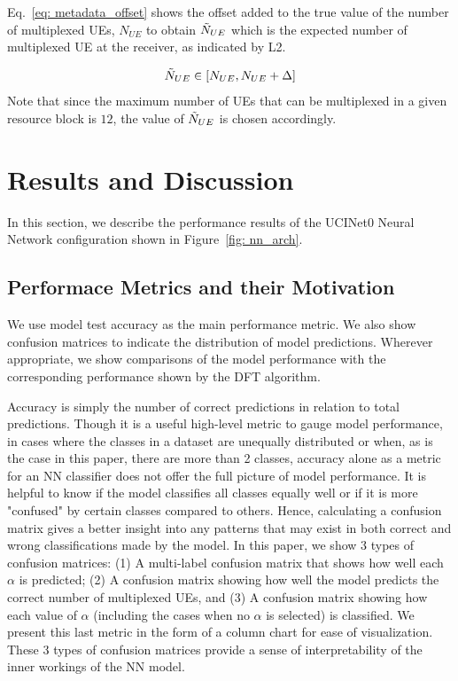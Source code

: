 \documentclass[journal]{IEEEtran}
\begin{document}
Eq.~\eqref{eq: metadata_offset} shows the offset added to the true value of the number of multiplexed UEs, $N_{UE}$ to obtain $\Tilde{N}_{UE}$ which is the expected number of multiplexed UE at the receiver, as indicated by L2.

\begin{equation}
    \Tilde{N}_{UE} \in [N_{UE}, N_{UE} + \Delta]
    \label{eq: metadata_offset}
\end{equation}
Note that since the maximum number of UEs that can be multiplexed in a given resource block is $12$, the value of $\Tilde{N}_{UE}$ is chosen accordingly. 

\section{Results and Discussion}
In this section, we describe the performance results of the UCINet0 Neural Network configuration shown in Figure~\ref{fig: nn_arch}. 

\subsection{Performace Metrics and their Motivation}
We use model test accuracy as the main performance metric. We also show confusion matrices to indicate the distribution of model predictions. Wherever appropriate, we show comparisons of the model performance with the corresponding performance shown by the DFT algorithm. 

Accuracy is simply the number of correct predictions in relation to total predictions. Though it is a useful high-level metric to gauge model performance, in cases where the classes in a dataset are unequally distributed or when, as is the case in this paper, there are more than 2 classes, accuracy alone as a metric for an NN classifier does not offer the full picture of model performance. It is helpful to know if the model classifies all classes equally well or if it is more "confused" by certain classes compared to others. Hence, calculating a confusion matrix gives a better insight into any patterns that may exist in both correct and wrong classifications made by the model. In this paper, we show 3 types of confusion matrices: (1) A multi-label confusion matrix that shows how well each $\alpha$ is predicted; (2) A confusion matrix showing how well the model predicts the correct number of multiplexed UEs, and (3) A confusion matrix showing how each value of $\alpha$ (including the cases when no $\alpha$ is selected) is classified. We present this last metric in the form of a column chart for ease of visualization. These 3 types of confusion matrices provide a sense of interpretability of the inner workings of the NN model. 
\end{document}
